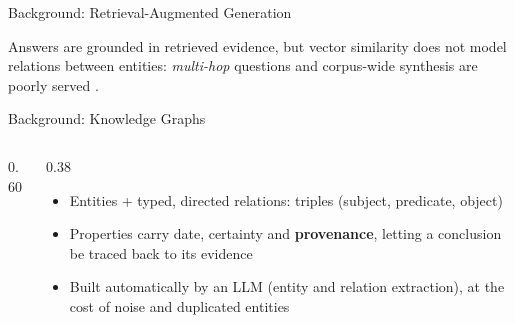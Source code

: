 \documentclass[9pt]{beamer}
\begin{document}
    \begin{frame}{Background: Retrieval-Augmented Generation}
        \begin{center}
            \resizebox{!}{0.56\textheight}{}
        \end{center}
        \small
        Answers are grounded in retrieved evidence, but vector similarity does not model relations between entities: \emph{multi-hop} questions and corpus-wide synthesis are poorly served \cite{gao2024,edge2024}.
    \end{frame}

    \begin{frame}{Background: Knowledge Graphs}
        \begin{columns}[c,totalwidth=0.95\textwidth]
            \begin{column}{0.60\textwidth}
                \centering
                \resizebox{!}{5.5cm}{}
            \end{column}
            \begin{column}{0.38\textwidth}
                \small
                \begin{itemize}
                    \itemsep3pt
                    \item Entities + typed, directed relations: triples (subject, predicate, object) \cite{hogan2021}
                    \item Properties carry date, certainty and \textbf{provenance}, letting a conclusion be traced back to its evidence
                    \item Built automatically by an LLM (entity and relation extraction), at the cost of noise and duplicated entities
                \end{itemize}
            \end{column}
        \end{columns}
    \end{frame}
\end{document}
